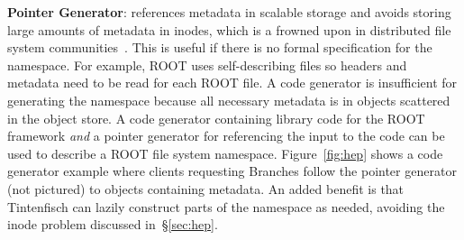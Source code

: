 \textbf{Pointer Generator}: references metadata in scalable storage and avoids
storing large amounts of metadata in inodes, which is a frowned upon in
distributed file system communities~\cite{docs:cephinternals}. This is useful
if there is no formal specification for the namespace. For example, ROOT uses
self-describing files so headers and metadata need to be read for each ROOT
file. A code generator is insufficient for generating the namespace because all
necessary metadata is in objects scattered in the object store.  A code
generator containing library code for the ROOT framework \emph{and} a pointer
generator for referencing the input to the code can be used to describe a ROOT
file system namespace.  Figure~\ref{fig:hep} shows a code generator example
where clients requesting Branches follow the pointer generator (not pictured)
to objects containing metadata. An added benefit is that Tintenfisch can lazily
construct parts of the namespace as needed, avoiding the inode problem
discussed in~\S\ref{sec:hep}.
